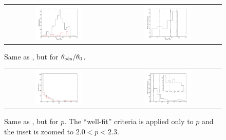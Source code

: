 \begin{figure}
\begin{center}
	\begin{tabular}{cc}
   		\includegraphics[width=0.45\textwidth]{figures/scalefit/distribution_ThObs.pdf} & \includegraphics[width=0.45\textwidth]{figures/scalefit/distribution_cut_ThObs.pdf}
    	\end{tabular}
    	\end{center}
	\caption{ Same as , but for $\theta_{obs} / \theta_0$.}
\end{figure}

\begin{figure}
	\begin{center}
	\begin{tabular}{cc}
    		\includegraphics[width=0.45\textwidth]{figures/scalefit/distribution_p.pdf} & \includegraphics[width=0.45\textwidth]{figures/scalefit/distribution_cut_p.pdf}
    	\end{tabular}
    	\end{center}
	\caption{ Same as , but for $p$.  The ``well-fit'' criteria is applied only to $p$ and the inset is zoomed to $2.0 < p < 2.3$.}
\end{figure}

